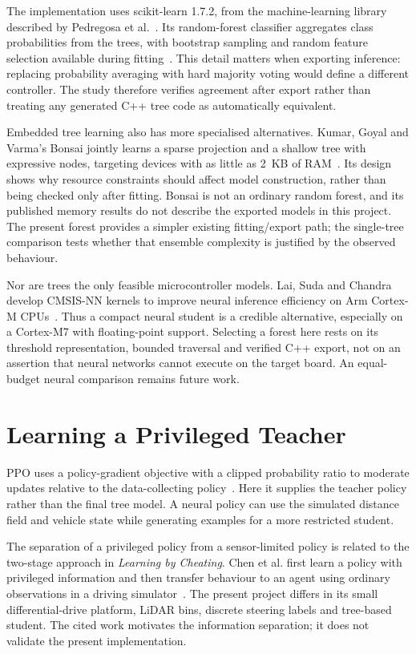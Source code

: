 The implementation uses scikit-learn 1.7.2, from the machine-learning library
described by Pedregosa et al.~\cite{pedregosa2011sklearn}. Its random-forest classifier
aggregates class probabilities from the trees, with bootstrap sampling and
random feature selection available during fitting~\cite{sklearnForest}.
This detail matters when exporting inference: replacing probability averaging
with hard majority voting would define a different controller. The study
therefore verifies agreement after export rather than treating any generated
C++ tree code as automatically equivalent.

Embedded tree learning also has more specialised alternatives. Kumar, Goyal
and Varma's Bonsai jointly learns a sparse projection and a shallow tree with
expressive nodes, targeting devices with as little as 2~KB of
RAM~\cite{kumar2017bonsai}. Its design shows why resource constraints should
affect model construction, rather than being checked only after fitting.
Bonsai is not an ordinary random forest, and its published memory results do
not describe the exported models in this project. The present forest provides
a simpler existing fitting/export path; the single-tree comparison tests
whether that ensemble complexity is justified by the observed behaviour.

Nor are trees the only feasible microcontroller models. Lai, Suda and Chandra
develop CMSIS-NN kernels to improve neural inference efficiency on Arm Cortex-M
CPUs~\cite{lai2018cmsis}. Thus a compact neural student is a credible alternative,
especially on a Cortex-M7 with floating-point support. Selecting a forest here
rests on its threshold representation, bounded traversal and verified C++ export,
not on an assertion that neural networks cannot execute on the target board.
An equal-budget neural comparison remains future work.

\section{Learning a Privileged Teacher}
PPO uses a policy-gradient objective with a clipped probability ratio to
moderate updates relative to the data-collecting policy~\cite{schulman2017ppo}.
Here it supplies the teacher policy rather than the final tree model. A neural
policy can use the simulated distance field and vehicle state while generating
examples for a more restricted student.

The separation of a privileged policy from a sensor-limited policy is related
to the two-stage approach in \emph{Learning by Cheating}. Chen et al. first
learn a policy with privileged information and then transfer behaviour to an
agent using ordinary observations in a driving simulator~\cite{chen2019cheating}.
The present project differs in its small differential-drive platform, LiDAR
bins, discrete steering labels and tree-based student. The cited work motivates
the information separation; it does not validate the present implementation.

